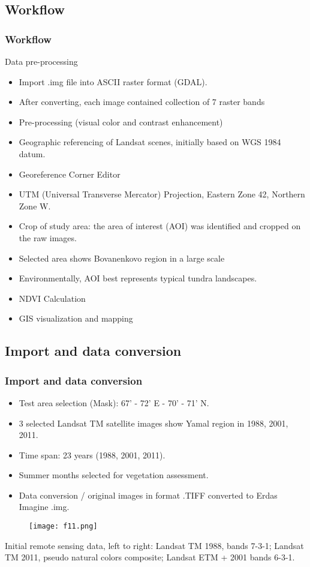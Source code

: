 \documentclass[pdflatex,compress,8pt,
	xcolor={dvipsnames,dvipsnames,svgnames,x11names,table},
	hyperref={colorlinks = true,breaklinks = true, urlcolor = NavyBlue, breaklinks = true}]{beamer}
\begin{document}
\subsection{Workflow}
\begin{frame}\frametitle{Workflow}
Data pre-processing
\begin{itemize}
            \item Import .img file into ASCII raster format (GDAL). 
            \item After converting, each image contained collection of 7 raster bands
            \item Pre-processing (visual color and contrast enhancement)
            \item Geographic referencing of Landsat scenes, initially based on WGS 1984 datum.
            \item Georeference Corner Editor
            \item UTM (Universal Transverse Mercator) Projection, Eastern Zone 42, Northern Zone W.
            \item Crop of study area: the area of interest (AOI) was identified and cropped on the raw images. 
            \item Selected area shows Bovanenkovo region in a large scale 
            \item Environmentally, AOI best represents typical tundra landscapes.
            \item NDVI Calculation
            \item GIS visualization and mapping
\end{itemize}
\end{frame}

\subsection{Import and data conversion}
\begin{frame}\frametitle{Import and data conversion}
\begin{itemize}
        \item Test area selection (Mask): 67' - 72' E - 70' - 71' N. 
	\item3 selected  Landsat TM satellite images show Yamal region in 1988, 2001, 2011.
	\item Time span: 23 years (1988, 2001, 2011). 
	\item Summer months selected for vegetation assessment. 
	\item Data conversion / original images in format .TIFF converted to Erdas Imagine .img.
\end{itemize}
\begin{figure}[H]
	\centering
		\texttt{[image: f11.png]}
\end{figure}
Initial remote sensing data, left to right: Landsat TM 1988, bands 7-3-1; Landsat TM 2011, pseudo natural colors composite; Landsat ETM + 2001 bands 6-3-1.
\end{frame}
\end{document}
